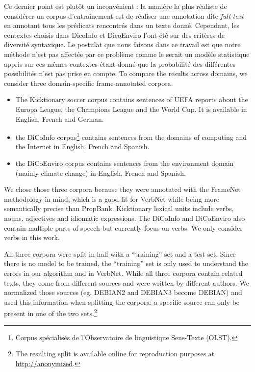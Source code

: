 Ce dernier point est plutôt un inconvénient : la manière la plus réaliste de
considérer un corpus d'entraînement est de réaliser une annotation dite
\textit{full-text} en annotant tous les prédicats rencontrés dans un texte
donné. Cependant, les contextes choisis dans DicoInfo et DicoEnviro l'ont été
sur des critères de diversité syntaxique. \citep{lhomme2012adding} Le postulat
que nous faisons dans ce travail est que notre méthode n'est pas affectée par
ce problème comme le serait un modèle statistique appris sur ces mêmes
contextes étant donné que la probabilité des différentes possibilités n'est pas
prise en compte.
To compare the results across domains, we consider three domain-specific
frame-annotated corpora.

\begin{itemize}

\item The Kicktionary soccer corpus \cite{schmidt2009kicktionary} contains
sentences of UEFA reports about the Europa League, the Champions League and the
World Cup. It is available in English, French and German.

\item the DiCoInfo corpus\footnote{\label{olst}Corpus spécialisés de
l'Observatoire de linguistique Sens-Texte (OLST).} contains sentences from the
domains of computing and the Internet in English, French and Spanish.

\item the DiCoEnviro\cite{corpusolst} corpus contains sentences from the
environment domain (mainly climate change) in English, French and Spanish.

\end{itemize}

We chose those three corpora because they were annotated with the FrameNet
methodology in mind, which is a good fit for VerbNet while being more
semantically precise than PropBank. Kicktionary lexical units include verbs,
nouns, adjectives and idiomatic expressions. The DiCoInfo and DiCoEnviro also
contain multiple parts of speech but currently focus on verbs.  We only
consider verbs in this work.

All three corpora were split in half with a ``training'' set and a test set.
Since there is no model to be trained, the ``training'' set is only used to
understand the errors in our algorithm and in VerbNet. While all three corpora
contain related texts, they come from different sources and were written by
different authors. We normalized those sources (eg. DEBIAN2 and DEBIAN3 become
DEBIAN) and used this information when splitting the corpora: a specific source
can only be present in one of the two sets.\footnote{The resulting split is
available online for reproduction purposes at \url{http://anonymized}.}

